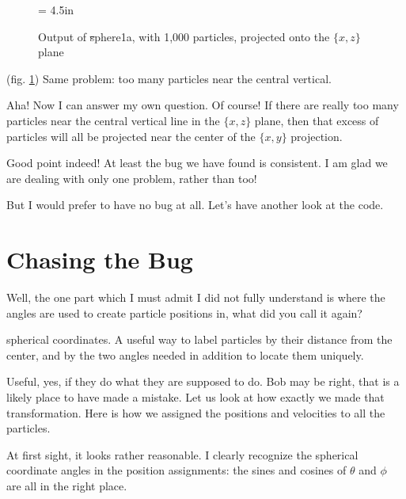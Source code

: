 \begin{figure}[htb]
\begin{center}
\epsfxsize = 4.5in
\caption[xz plot of {\st sphere1a} output]
{Output of {\st sphere1a}, with 1,000 particles, projected onto the
$\{x,z\}$ plane}
\label{fig:sphere1axz1000}
\end{center}
\end{figure}

\abc

\carol
(fig. \ref{fig:sphere1axz1000}) 
Same problem: too many particles near the central vertical.

\bob
Aha!  Now I can answer my own question.  Of course!  If there are
really too many particles near the central vertical line in the
$\{x,z\}$ plane, then that excess of particles will all be projected
near the center of the $\{x,y\}$ projection.

\alice
Good point indeed!  At least the bug we have found is consistent.
I am glad we are dealing with only one problem, rather than too!

\carol
But I would prefer to have no bug at all.  Let's have another look at
the code.

\cba

\section{Chasing the Bug}

\abc

\bob
Well, the one part which I must admit I did not fully understand is
where the angles are used to create particle positions in, what did
you call it again?

\alice
spherical coordinates.  A useful way to label particles by their
distance from the center, and by the two angles needed in addition to
locate them uniquely.

\carol
Useful, yes, if they do what they are supposed to do.  Bob may be right,
that is a likely place to have made a mistake.  Let us look at how
exactly we made that transformation.  Here is how we assigned the
positions and velocities to all the particles.

\cba


\abc

\alice
At first sight, it looks rather reasonable.  I clearly recognize the
spherical coordinate angles in the position assignments: the sines and
cosines of $\theta$ and $\phi$ are all in the right place.

